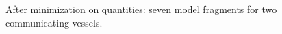 \documentclass{article} %
\begin{document}
\begin{figure}[ht]
{}

\caption{After minimization on quantities: seven model fragments for two communicating vessels.}
\label{cv_frags}
\end{figure}
\end{document}
